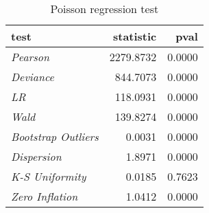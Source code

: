 \begin{table}[H]

\caption{\label{tab:poisson_reg_tests}Poisson regression test}
\centering
\begin{tabular}[t]{>{}l|r|r}
\hline
test & statistic & pval\\
\hline
\hline
\em{Pearson} & 2279.8732 & 0.0000\\
\hline
\em{Deviance} & 844.7073 & 0.0000\\
\hline
\em{LR} & 118.0931 & 0.0000\\
\hline
\em{Wald} & 139.8274 & 0.0000\\
\hline
\em{Bootstrap Outliers} & 0.0031 & 0.0000\\
\hline
\em{Dispersion} & 1.8971 & 0.0000\\
\hline
\em{K-S Uniformity} & 0.0185 & 0.7623\\
\hline
\em{Zero Inflation} & 1.0412 & 0.0000\\
\hline
\end{tabular}
\end{table}